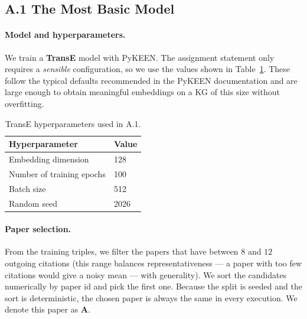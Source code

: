 \documentclass{article}
\begin{document}
\subsection*{A.1 \hspace{0.3em} The Most Basic Model}

\paragraph{Model and hyperparameters.}
We train a \textbf{TransE} model with PyKEEN. The assignment statement only
requires a \emph{sensible} configuration, so we use the values shown in
Table~\ref{tab:a1-hparams}. These follow the typical defaults recommended in the
PyKEEN documentation and are large enough to obtain meaningful embeddings on a
KG of this size without overfitting.

\begin{table}[H]
\centering
\caption{TransE hyperparameters used in A.1.}
\label{tab:a1-hparams}
\begin{tabular}{ll}
\toprule
\textbf{Hyperparameter} & \textbf{Value} \\
\midrule
Embedding dimension     & 128 \\
Number of training epochs & 100 \\
Batch size              & 512 \\
Random seed             & 2026 \\
\bottomrule
\end{tabular}
\end{table}

\paragraph{Paper selection.}
From the training triples, we filter the papers that have between $8$ and $12$
outgoing citations (this range balances representativeness --- a paper with too
few citations would give a noisy mean --- with generality). We sort the
candidates numerically by paper id and pick the first one. Because the split is
seeded and the sort is deterministic, the chosen paper is always the same in
every execution. We denote this paper as \textbf{A}.
\end{document}
